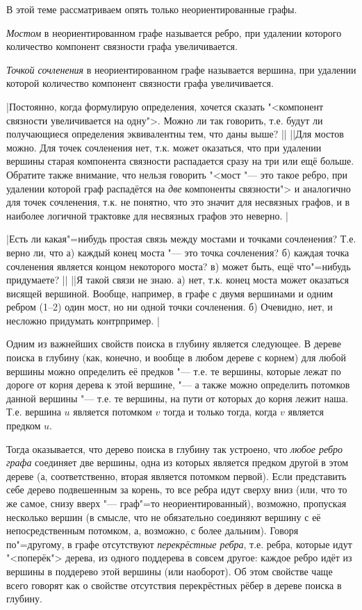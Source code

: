 В этой теме рассматриваем опять только неориентированные графы.

\textit{Мостом} в неориентированном графе называется ребро, при удалении которого количество компонент связности графа 
увеличивается. 

\textit{Точкой сочленения} в неориентированном графе называется вершина, при удалении которой количество компонент 
связности графа увеличивается.

\task|Постоянно, когда формулирую определения, хочется сказать "< компонент связности
увеличивается на одну">. Можно ли так говорить, т.е. будут ли получающиеся определения эквивалентны
тем, что даны выше?
||
||Для мостов можно. Для точек сочленения нет, т.к. может оказаться, что при удалении вершины
старая компонента связности распадается сразу на три или ещё больше. Обратите также внимание, что нельзя говорить
"<мост "--- это такое ребро, при удалении которой граф распадётся на \textit{две} компоненты связности"> и аналогично для 
точек сочленения, т.к. не понятно, что это значит для несвязных графов, и в наиболее логичной трактовке для 
несвязных графов это неверно.
|\label{bridgeone}

\task|Есть ли какая"=нибудь простая связь между мостами и точками сочленения? Т.е. верно ли, что
а) каждый конец моста "--- это точка сочленения? б) каждая точка сочленения является концом некоторого моста? 
в) может быть, ещё что"=нибудь придумаете?
||
||Я такой связи не знаю. а) нет, т.к. конец моста может оказаться висящей вершиной.
Вообще, например, в графе с двумя вершинами и одним ребром (1--2) один мост, но ни одной точки сочленения.
б) Очевидно, нет, и несложно придумать контрпример.
|\label{bridgesandSV}

 Одним из важнейших свойств поиска в глубину является следующее.
В дереве поиска в глубину (как, конечно, и вообще в любом дереве с корнем) для любой вершины
можно определить её предков "--- т.е. те вершины, которые лежат по дороге от корня дерева к этой 
вершине, "--- а также можно определить потомков данной вершины "--- т.е. те вершины, на пути от которых до 
корня лежит наша. Т.е. вершина $u$ является потомком $v$ тогда и только тогда, когда $v$ является предком $u$.

Тогда оказывается, что дерево поиска в глубину так устроено, что \textit{любое ребро графа} соединяет 
две вершины, одна из которых является предком другой в этом дереве (а, соответственно, вторая
является потомком первой). Если представить себе дерево подвешенным за корень, то все ребра идут сверху вниз
(или, что то же самое, снизу вверх "--- граф"=то неориентированный), возможно, пропуская несколько вершин
(в смысле, что не обязательно соединяют вершину с её непосредственным потомком, а, возможно, с более дальним).
Говоря по"=другому, в графе отсутствуют \textit{перекрёстные ребра}, т.е. ребра, которые идут "<поперёк">
дерева, из одного поддерева в совсем другое: каждое ребро идёт из вершины в поддерево этой
вершины (или наоборот). Об этом свойстве чаще всего говорят как о свойстве отсутствия перекрёстных рёбер в
дереве поиска в глубину.

